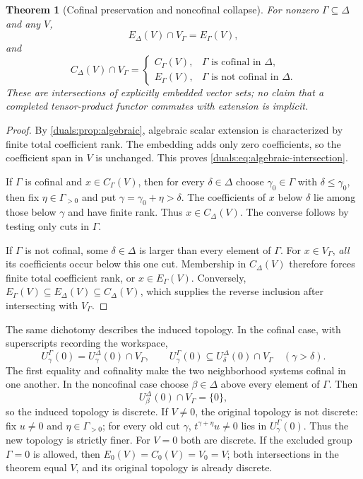 \documentclass[11pt,letterpaper]{article}
\numberwithin{equation}{section}
\newtheorem{theorem}{Theorem}[section]
\theoremstyle{definition}
\theoremstyle{remark}
\begin{document}
\begin{theorem}[Cofinal preservation and noncofinal collapse]
\label{duals:thm:basechange}
For nonzero $\Gamma\subseteq\Delta$ and any $V$,
\begin{equation}\label{duals:eq:algebraic-intersection}
 E_\Delta(V)\cap V_\Gamma=E_\Gamma(V),
\end{equation}
and
\begin{equation}\label{duals:eq:completion-basechange}
 C_\Delta(V)\cap V_\Gamma=
 \begin{cases}
 C_\Gamma(V),&\Gamma\text{ is cofinal in }\Delta,\\
 E_\Gamma(V),&\Gamma\text{ is not cofinal in }\Delta.
 \end{cases}
\end{equation}
These are intersections of explicitly embedded vector sets; no claim
that a completed tensor-product functor commutes with extension is
implicit.
\end{theorem}
\begin{proof}
By \cref{duals:prop:algebraic}, algebraic scalar extension is
characterized by finite total coefficient rank. The embedding adds
only zero coefficients, so the coefficient span in $V$ is unchanged.
This proves
\eqref{duals:eq:algebraic-intersection}.

If $\Gamma$ is cofinal and $x\in C_\Gamma(V)$, then for every
$\delta\in\Delta$ choose $\gamma_0\in\Gamma$ with
$\delta\le\gamma_0$, then fix $\eta\in\Gamma_{>0}$ and put
$\gamma=\gamma_0+\eta>\delta$. The coefficients of $x$ below $\delta$ lie among those below
$\gamma$ and have finite rank. Thus $x\in C_\Delta(V)$.
The converse follows by testing only cuts in $\Gamma$.

If $\Gamma$ is not cofinal, some $\delta\in\Delta$ is larger than
every element of $\Gamma$. For $x\in V_\Gamma$, \emph{all} its
coefficients occur below this one cut. Membership in $C_\Delta(V)$
therefore forces finite total coefficient rank, or
$x\in E_\Gamma(V)$. Conversely,
$E_\Gamma(V)\subseteq E_\Delta(V)\subseteq C_\Delta(V)$,
which supplies the reverse inclusion after intersecting with $V_\Gamma$.
\end{proof}

The same dichotomy describes the induced topology. In the cofinal case,
with superscripts recording the workspace,
\[
 U^\Gamma_\gamma(0)=U^\Delta_\gamma(0)\cap V_\Gamma,
 \qquad
 U^\Gamma_\gamma(0)\subseteq U^\Delta_\delta(0)\cap V_\Gamma
 \quad(\gamma>\delta).
\]
The first equality and cofinality make the two neighborhood systems
cofinal in one another. In the noncofinal case choose $\beta\in\Delta$
above every element of $\Gamma$. Then
\[
 U^\Delta_\beta(0)\cap V_\Gamma=\{0\},
\]
so the induced topology is discrete. If $V\ne0$, the original topology
is not discrete: fix $u\ne0$ and $\eta\in\Gamma_{>0}$; for every old cut $\gamma$,
$t^{\gamma+\eta}u\ne0$ lies in $U^\Gamma_\gamma(0)$.
Thus the new topology is strictly finer. For $V=0$ both are discrete.
If the excluded group $\Gamma=0$ is allowed, then
$E_0(V)=C_0(V)=V_0=V$; both intersections in the theorem equal $V$,
and its original topology is already discrete.
\end{document}
